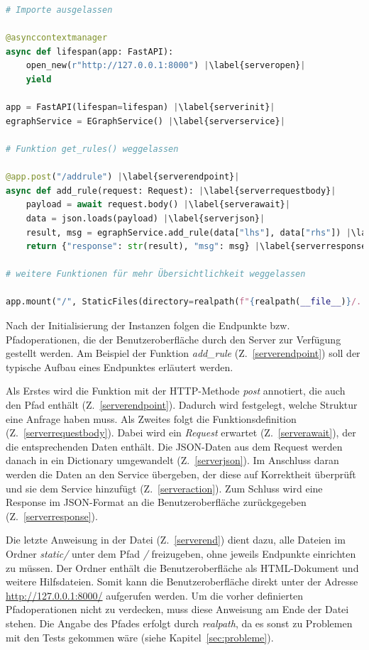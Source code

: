 \begin{lstlisting}[language=Python, escapechar=|, caption=Auszug aus der Datei \textit{server.py}, label={lst:server}]
# Importe ausgelassen 

@asynccontextmanager
async def lifespan(app: FastAPI):
    open_new(r"http://127.0.0.1:8000") |\label{serveropen}|
    yield

app = FastAPI(lifespan=lifespan) |\label{serverinit}|
egraphService = EGraphService() |\label{serverservice}|

# Funktion get_rules() weggelassen

@app.post("/addrule") |\label{serverendpoint}|
async def add_rule(request: Request): |\label{serverrequestbody}|
    payload = await request.body() |\label{serverawait}|
    data = json.loads(payload) |\label{serverjson}|
    result, msg = egraphService.add_rule(data["lhs"], data["rhs"]) |\label{serveraction}|
    return {"response": str(result), "msg": msg} |\label{serverresponse}|

# weitere Funktionen für mehr Übersichtlichkeit weggelassen 

app.mount("/", StaticFiles(directory=realpath(f"{realpath(__file__)}/../static"), html=True), name="static") |\label{serverend}|
\end{lstlisting} 

Nach der Initialisierung der Instanzen folgen die Endpunkte bzw. Pfadoperationen, die der Benutzeroberfläche durch den Server zur Verfügung gestellt werden.
Am Beispiel der Funktion \textit{add\_rule} (Z.~\ref{serverendpoint}) soll der typische Aufbau eines Endpunktes erläutert werden.

Als Erstes wird die Funktion mit der HTTP-Methode \textit{post} annotiert, die auch den Pfad enthält (Z.~\ref{serverendpoint}).
Dadurch wird festgelegt, welche Struktur eine Anfrage haben muss.
Als Zweites folgt die Funktionsdefinition (Z.~\ref{serverrequestbody}). Dabei wird ein \textit{Request} erwartet (Z.~\ref{serverawait}), der die entsprechenden Daten enthält. 
Die JSON-Daten aus dem Request werden danach in ein Dictionary umgewandelt (Z.~\ref{serverjson}).
Im Anschluss daran werden die Daten an den Service übergeben, der diese auf Korrektheit überprüft und sie dem Service hinzufügt (Z.~\ref{serveraction}).
Zum Schluss wird eine Response im JSON-Format an die Benutzeroberfläche zurückgegeben (Z.~\ref{serverresponse}).

Die letzte Anweisung in der Datei (Z.~\ref{serverend}) dient dazu, alle Dateien im Ordner \textit{static/} unter dem Pfad \textit{/} freizugeben, ohne jeweils Endpunkte einrichten zu müssen.
Der Ordner enthält die Benutzeroberfläche als HTML-Dokument und weitere Hilfsdateien. Somit kann die Benutzeroberfläche direkt unter der Adresse \url{http://127.0.0.1:8000/}
aufgerufen werden. Um die vorher definierten Pfadoperationen nicht zu verdecken, muss diese Anweisung am Ende der Datei stehen.
Die Angabe des Pfades erfolgt durch \textit{realpath}, da es sonst zu Problemen mit den Tests gekommen wäre (siehe Kapitel~\ref{sec:probleme}).

